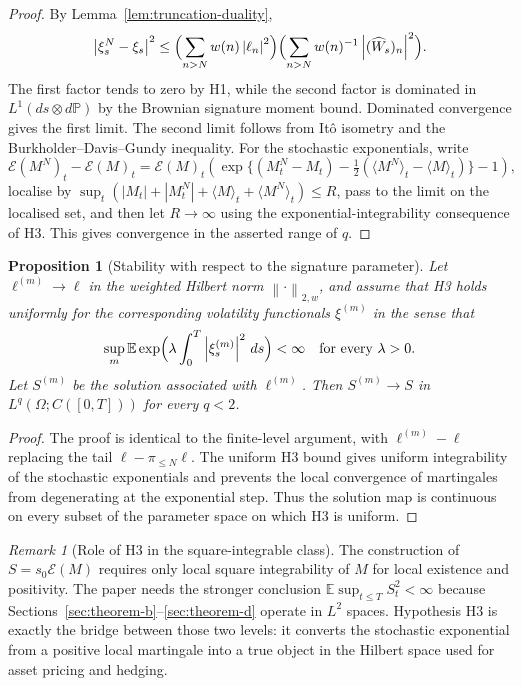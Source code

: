 \documentclass[11pt,oneside]{article}
\theoremstyle{plain}
\newtheorem{proposition}[theorem]{Proposition}
\theoremstyle{definition}
\theoremstyle{remark}
\newtheorem{remark}[theorem]{Remark}
\newcommand{\E}{\mathbb{E}}
\newcommand{\Pp}{\mathbb{P}}
\newcommand{\cW}{\widehat W}
\newcommand{\norm}[1]{\left\lVert #1\right\rVert}
\newcommand{\abs}[1]{\left\lvert #1\right\rvert}
\begin{document}
\begin{proof}
By Lemma~\ref{lem:truncation-duality},
\[
\abs{\xi^N_s-\xi_s}^2
\leq \Bigl(\sum_{n>N}w(n)\abs{\ell_n}^2\Bigr)
      \Bigl(\sum_{n>N}w(n)^{-1}\abs{(\cW_s)_n}^2\Bigr).
\]
The first factor tends to zero by H1, while the second factor is dominated in $L^1(ds\otimes d\Pp)$ by the Brownian signature moment bound. Dominated convergence gives the first limit. The second limit follows from It\^o isometry and the Burkholder--Davis--Gundy inequality. For the stochastic exponentials, write
\[
\mathcal E(M^N)_t-\mathcal E(M)_t
=\mathcal E(M)_t\left(\exp\{(M^N_t-M_t)-\tfrac12(\langle M^N\rangle_t-\langle M\rangle_t)\}-1\right),
\]
localise by $\sup_t(\abs{M_t}+\abs{M^N_t}+\langle M\rangle_t+\langle M^N\rangle_t)\leq R$, pass to the limit on the localised set, and then let $R\to\infty$ using the exponential-integrability consequence of H3. This gives convergence in the asserted range of $q$.
\end{proof}

\begin{proposition}[Stability with respect to the signature parameter]
\label{prop:parameter-stability}
Let $\ell^{(m)}\to \ell$ in the weighted Hilbert norm $\norm{\cdot}_{2,w}$, and assume that H3 holds uniformly for the corresponding volatility functionals $\xi^{(m)}$ in the sense that
\[
\sup_m \E\exp\Bigl(\lambda\int_0^T\abs{\xi^{(m)}_s}^2\,ds\Bigr)<\infty
\quad\hbox{for every }\lambda>0.
\]
Let $S^{(m)}$ be the solution associated with $\ell^{(m)}$. Then $S^{(m)}\to S$ in $L^q(\Omega;C([0,T]))$ for every $q<2$.
\end{proposition}

\begin{proof}
The proof is identical to the finite-level argument, with $\ell^{(m)}-\ell$ replacing the tail $\ell-\pi_{\leq N}\ell$. The uniform H3 bound gives uniform integrability of the stochastic exponentials and prevents the local convergence of martingales from degenerating at the exponential step. Thus the solution map is continuous on every subset of the parameter space on which H3 is uniform.
\end{proof}

\begin{remark}[Role of H3 in the square-integrable class]
The construction of $S=s_0\mathcal E(M)$ requires only local square integrability of $M$ for local existence and positivity. The paper needs the stronger conclusion $\E\sup_{t\leq T}S_t^2<\infty$ because Sections~\ref{sec:theorem-b}--\ref{sec:theorem-d} operate in $L^2$ spaces. Hypothesis H3 is exactly the bridge between those two levels: it converts the stochastic exponential from a positive local martingale into a true object in the Hilbert space used for asset pricing and hedging.
\end{remark}
\end{document}
